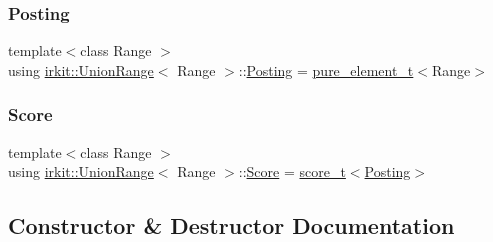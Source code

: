 \mbox{\label{classirkit_1_1UnionRange_a5f694970419f5a60d7fd41d740556229}} 
\subsubsection{\texorpdfstring{Posting}{Posting}}
{\footnotesize\ttfamily template$<$class Range $>$ \\
using \hyperlink{classirkit_1_1UnionRange}{irkit\+::\+Union\+Range}$<$ Range $>$\+::\hyperlink{classirkit_1_1UnionRange_a5f694970419f5a60d7fd41d740556229}{Posting} =  \hyperlink{namespaceirkit_afcffab67300c5c703cb38a363c9a6f1d}{pure\+\_\+element\+\_\+t}$<$Range$>$\hspace{0.3cm}{\ttfamily [protected]}}

\mbox{\label{classirkit_1_1UnionRange_a47fb098a85581f5e33f4203e16245dae}} 
\subsubsection{\texorpdfstring{Score}{Score}}
{\footnotesize\ttfamily template$<$class Range $>$ \\
using \hyperlink{classirkit_1_1UnionRange}{irkit\+::\+Union\+Range}$<$ Range $>$\+::\hyperlink{classirkit_1_1UnionRange_a47fb098a85581f5e33f4203e16245dae}{Score} =  \hyperlink{namespaceirkit_a754dabe3346f950c948e7596d9d46c71}{score\+\_\+t}$<$\hyperlink{classirkit_1_1UnionRange_a5f694970419f5a60d7fd41d740556229}{Posting}$>$\hspace{0.3cm}{\ttfamily [protected]}}



\subsection{Constructor \& Destructor Documentation}
\mbox{\label{classirkit_1_1UnionRange_a23072335eaa144321314fbbdd39e9423}} 
